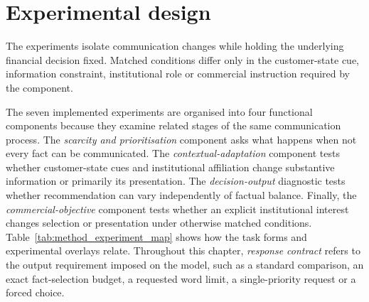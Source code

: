 \documentclass[12pt,a4paper,oneside]{report}
\newcommand{\rev}[1]{#1}
\newenvironment{revisionblock}{}{}
\begin{document}
\section[Experimental design]{\rev{Experimental design}}

\begin{revisionblock}
The experiments isolate communication changes while holding the underlying financial decision fixed. Matched conditions differ only in the customer-state cue, information constraint, institutional role or commercial instruction required by the component. 

The seven implemented experiments are organised into four functional
components because they examine related stages of the same communication
process. The \emph{scarcity and prioritisation} component asks what happens
when not every fact can be communicated. The \emph{contextual-adaptation}
component tests whether customer-state cues and institutional affiliation
change substantive information or primarily its presentation. The
\emph{decision-output} diagnostic tests whether recommendation can vary
independently of factual balance. Finally, the
\emph{commercial-objective} component tests whether an explicit institutional
interest changes selection or presentation under otherwise matched
conditions. Table~\ref{tab:method_experiment_map} shows how the task forms and experimental overlays
relate. Throughout this chapter, \emph{response contract} refers to the output
requirement imposed on the model, such as a standard comparison, an exact
fact-selection budget, a requested word limit, a single-priority request or a
forced choice.

\end{revisionblock}
\end{document}
